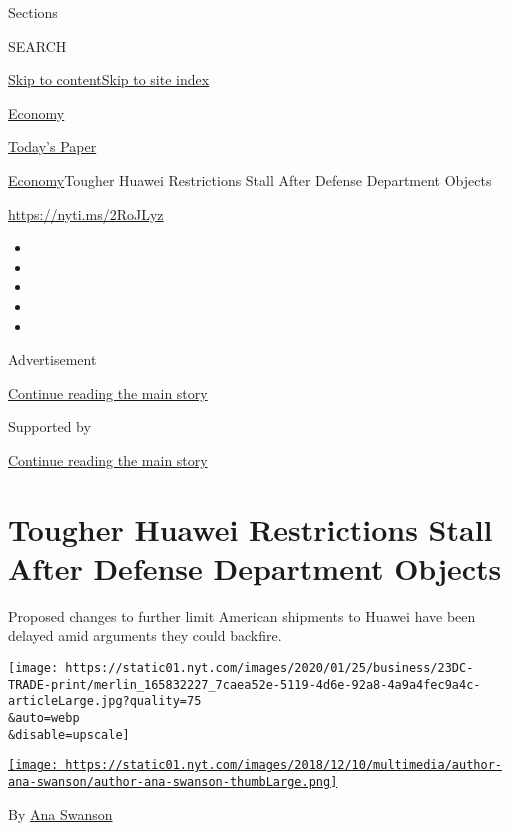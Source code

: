 Sections

SEARCH

\protect\hyperlink{site-content}{Skip to
content}\protect\hyperlink{site-index}{Skip to site index}

\href{https://www.nytimes.com/section/business/economy}{Economy}

\href{https://myaccount.nytimes.com/auth/login?response_type=cookie\&client_id=vi}{}

\href{https://www.nytimes.com/section/todayspaper}{Today's Paper}

\href{/section/business/economy}{Economy}\textbar{}Tougher Huawei
Restrictions Stall After Defense Department Objects

\url{https://nyti.ms/2RoJLyz}

\begin{itemize}
\item
\item
\item
\item
\item
\end{itemize}

Advertisement

\protect\hyperlink{after-top}{Continue reading the main story}

Supported by

\protect\hyperlink{after-sponsor}{Continue reading the main story}

\hypertarget{tougher-huawei-restrictions-stall-after-defense-department-objects}{%
\section{Tougher Huawei Restrictions Stall After Defense Department
Objects}\label{tougher-huawei-restrictions-stall-after-defense-department-objects}}

Proposed changes to further limit American shipments to Huawei have been
delayed amid arguments they could backfire.

\texttt{[image: https://static01.nyt.com/images/2020/01/25/business/23DC-TRADE-print/merlin\_165832227\_7caea52e-5119-4d6e-92a8-4a9a4fec9a4c-articleLarge.jpg?quality=75\\\&auto=webp\\\&disable=upscale]}

\href{https://www.nytimes.com/by/ana-swanson}{\texttt{[image: https://static01.nyt.com/images/2018/12/10/multimedia/author-ana-swanson/author-ana-swanson-thumbLarge.png]}}

By \href{https://www.nytimes.com/by/ana-swanson}{Ana Swanson}

